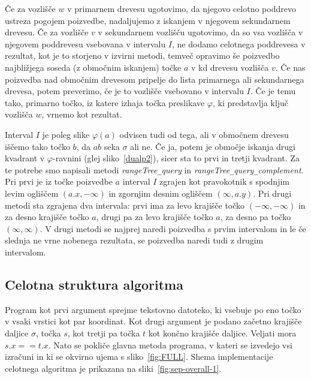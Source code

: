 \documentclass[a4paper, 12pt]{book}
\newcommand{\U}{\texttt{\_}}
\begin{document}
Če za vozlišče $w$ v primarnem drevesu ugotovimo, da njegovo celotno poddrevo ustreza pogojem poizvedbe, nadaljujemo z iskanjem v njegovem sekundarnem drevesu. Če za vozlišče $v$ v sekundarnem vozlišču ugotovimo, da so vsa vozlišča v njegovem poddrevesu vsebovana v intervalu $I$, ne dodamo celotnega poddrevesa v rezultat, kot je to storjeno v izvirni metodi, temveč opravimo še poizvedbo najbližjega soseda (z območnim iskanjem) točke $a$ v kd drevesu vozlišča $v$. Če nas poizvedba nad območnim drevesom pripelje do lista primarnega ali sekundarnega drevesa, potem preverimo, če je to vozlišče vsebovano v intervalu $I$. Če je temu tako, primarno točko, iz katere izhaja točka preslikave $\varphi$, ki predstavlja ključ vozlišča $w$, vrnemo kot rezultat.

Interval $I$ je poleg slike $\varphi (a)$ odvisen tudi od tega, ali v območnem drevesu iščemo tako točko $b$, da $ab$ seka $\sigma$ ali ne. Če ja, potem je območje iskanja drugi kvadrant v $\varphi$-ravnini (glej sliko~\ref{dualp2}), sicer sta to prvi in tretji kvadrant. Za te potrebe smo napisali metodi \textit{rangeTree\U query} in \textit{rangeTree\U query\U complement}. Pri prvi je iz točke poizvedbe $a$ interval $I$ zgrajen kot pravokotnik s spodnjim levim ogliščem $(a.x, -\infty)$ in zgornjim desnim ogliščem $(\infty, a.y)$. Pri drugi metodi sta zgrajena dva intervala: prvi ima za levo krajišče točko $(-\infty, -\infty)$ in za desno krajišče točko $a$, drugi pa za levo krajišče točko $a$, za desno pa točko $(\infty, \infty)$. V drugi metodi se najprej naredi poizvedba s prvim intervalom in le če slednja ne vrne nobenega rezultata, se poizvedba naredi tudi z drugim intervalom.

\subsection{Celotna struktura algoritma}

Program kot prvi argument sprejme tekstovno datoteko, ki vsebuje po eno točko v vsaki vrstici kot par koordinat. Kot drugi argument je podano začetno krajišče daljice $\sigma$, točka $s$, kot tretji pa točka $t$ kot končno krajišče daljice. Veljati mora $s.x == t.x$. Nato se pokliče glavna metoda programa, v kateri se izvedejo vsi izračuni in ki se okvirno ujema s sliko~\ref{fig:FULL}. Shema implementacije celotnega algoritma je prikazana na sliki~\ref{fig:sep-overall-1}.
\end{document}
